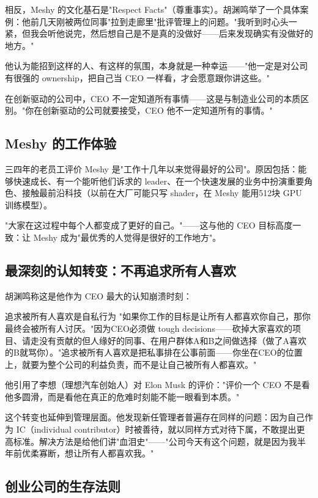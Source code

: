 \documentclass[a4paper]{article}
\begin{document}
相反，Meshy 的文化基石是"Respect Facts"（尊重事实）。胡渊鸣举了一个具体案例：他前几天刚被两位同事"拉到走廊里"批评管理上的问题。"我听到时心头一紧，但我会听他说完，然后想自己是不是真的没做好——后来发现确实有没做好的地方。"

他认为能招到这样的人、有这样的氛围，本身就是一种幸运——"他一定是对公司有很强的 ownership，把自己当 CEO 一样看，才会愿意跟你讲这些。"

在创新驱动的公司中，CEO 不一定知道所有事情——这是与制造业公司的本质区别。"你在创新驱动的公司就要接受，CEO 他不一定知道所有的事情。"

\subsection{Meshy 的工作体验}

三四年的老员工评价 Meshy 是"工作十几年以来觉得最好的公司"。原因包括：能够快速成长、有一个能听他们诉求的 leader、在一个快速发展的业务中扮演重要角色、接触最前沿科技（以前在大厂可能只写 shader，在 Meshy 能用512块 GPU 训练模型）。

"大家在这过程中每个人都变成了更好的自己。"——这与他的 CEO 目标高度一致：让 Meshy 成为"最优秀的人觉得是很好的工作地方"。

\subsection{最深刻的认知转变：不再追求所有人喜欢}

胡渊鸣称这是他作为 CEO 最大的认知崩溃时刻：

\begin{warningbox}{追求被所有人喜欢是自私行为}
"如果你工作的目标是让所有人都喜欢你自己，那你最终会被所有人讨厌。"因为CEO必须做 tough decisions——砍掉大家喜欢的项目、请走没有贡献的但人缘好的同事、在用户群体A和B之间做选择（做了A喜欢的B就骂你）。"追求被所有人喜欢是把私事排在公事前面——你坐在CEO的位置上，就要为整个公司的利益负责，而不是让自己被所有人都喜欢。"
\end{warningbox}

他引用了李想（理想汽车创始人）对 Elon Musk 的评价："评价一个 CEO 不是看他多圆滑，而是看他在真正的危难时刻能不能一眼看到本质。"

这个转变也延伸到管理层面。他发现新任管理者普遍存在同样的问题：因为自己作为 IC（individual contributor）时被善待，就以同样方式对待下属，不敢提出更高标准。解决方法是给他们讲"血泪史"——"公司今天有这个问题，就是因为我半年前优柔寡断，想让所有人都喜欢我。"

\subsection{创业公司的生存法则}
\end{document}
